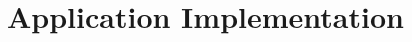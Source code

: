 \documentclass[twoside]{hcmut-report}
\begin{document}












\newpage
\section{Application Implementation}



\end{document}
